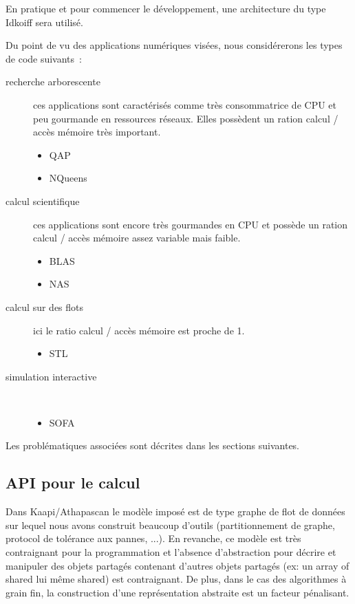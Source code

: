 \documentclass{report}
\begin{document}
En pratique et pour commencer le développement, une architecture du type Idkoiff sera utilisé.


Du point de vu des applications numériques visées, nous considérerons les types de code suivants~:
\begin{description}
\item [recherche arborescente] ces applications sont caractérisés comme très consommatrice de CPU et peu gourmande en ressources réseaux. Elles possèdent un ration calcul / accès mémoire très important.
\begin{itemize}
\item QAP
\item NQueens
\end{itemize}

\item [calcul scientifique] ces applications sont encore très gourmandes en CPU et possède un ration calcul / accès mémoire assez variable mais faible.
\begin{itemize}
\item BLAS
\item NAS
\end{itemize}

\item [calcul sur des flots] ici le ratio calcul / accès mémoire est proche de 1.
\begin{itemize}
\item STL
\end{itemize}

\item [simulation interactive] ~\\
\begin{itemize}
\item SOFA
\end{itemize}

\end{description}


Les problématiques associées sont  décrites dans les sections suivantes.
\subsection{API pour le calcul}
Dans Kaapi/Athapascan le modèle imposé est de type graphe de flot de données sur lequel nous avons construit beaucoup d'outils (partitionnement de graphe, protocol de tolérance aux pannes, ...). En revanche, ce modèle est très contraignant pour la programmation et l'absence d'abstraction pour décrire et manipuler des objets partagés contenant d'autres objets partagés (ex: un array of shared lui même shared) est contraignant. De plus, dans le cas des algorithmes à grain fin, la construction d'une représentation abstraite est un facteur pénalisant.
\end{document}
